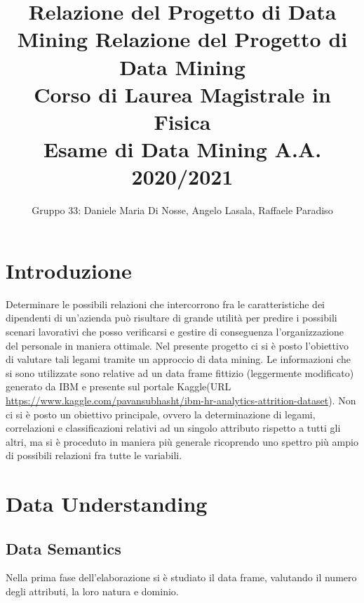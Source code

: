 \documentclass[a4paper,9pt]{article}
\begin{document}
\title{Relazione del Progetto di Data Mining}
\title{%
  Relazione del Progetto di Data Mining \\
  \large Corso di Laurea Magistrale in Fisica \\
    Esame di Data Mining A.A. 2020/2021}
\author{Gruppo 33: Daniele Maria Di Nosse, Angelo Lasala, Raffaele Paradiso}
\maketitle
\newpage

\maketitle
\tableofcontents{}

\newpage

\section{Introduzione}
Determinare le possibili relazioni che intercorrono fra le caratteristiche dei dipendenti di un'azienda può risultare di grande utilità per predire i possibili scenari lavorativi che posso verificarsi e gestire di conseguenza l'organizzazione del personale in maniera ottimale. Nel presente progetto ci si è posto l'obiettivo di valutare tali legami tramite un approccio di data mining. Le informazioni che si sono utilizzate sono relative ad un data frame fittizio (leggermente modificato) generato da IBM e presente sul portale Kaggle(URL \url{https://www.kaggle.com/pavansubhasht/ibm-hr-analytics-attrition-dataset}). Non ci si è posto un obiettivo principale, ovvero la determinazione di legami, correlazioni e classificazioni relativi ad un singolo attributo rispetto a tutti gli altri, ma si è proceduto in maniera più generale ricoprendo uno spettro più ampio di possibili relazioni fra tutte le variabili.
\section{Data Understanding}
\subsection{Data Semantics}
Nella prima fase dell'elaborazione si è studiato il data frame, valutando il numero degli attributi, la loro natura e dominio. 

\end{document}
